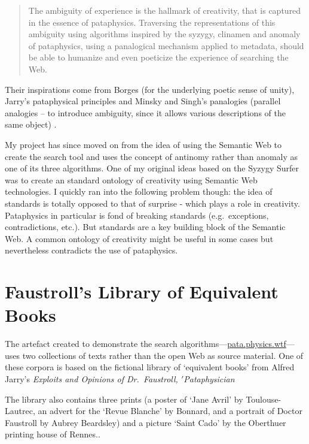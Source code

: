\begin{quotation}
  The ambiguity of experience is the hallmark of creativity, that is captured in the essence of pataphysics. Traversing the representations of this ambiguity using algorithms inspired by the syzygy, clinamen and anomaly of pataphysics, using a panalogical mechanism applied to metadata, should be able to humanize and even poeticize the experience of searching the Web. 
\end{quotation}

Their inspirations come from Borges \citeyear{Borges2000} (for the underlying poetic sense of unity), Jarry's pataphysical principles \citeyear{Jarry1996} and Minsky and Singh's panalogies (parallel analogies – to introduce ambiguity, since it allows various descriptions of the same object) \citeyear{Singh2005}.

My project has since moved on from the idea of using the Semantic Web to create the search tool and uses the concept of antinomy rather than anomaly as one of its three algorithms. One of my original ideas based on the Syzygy Surfer was to create an standard ontology of creativity using Semantic Web technologies. I quickly ran into the following problem though: the idea of standards is totally opposed to that of surprise - which plays a role in creativity. Pataphysics in particular is fond of breaking standards (e.g.\ exceptions, contradictions, etc.). But standards are a key building block of the Semantic Web. A common ontology of creativity might be useful in some cases but nevertheless contradicts the use of pataphysics.


\section{Faustroll's Library of Equivalent Books}
\label{s:faustlib}

The artefact created to demonstrate the search algorithms---\url{pata.physics.wtf}---uses two collections of texts rather than the open Web as source material. One of these corpora is based on the fictional library of `equivalent books' from Alfred Jarry's \textit{Exploits and Opinions of Dr.\ Faustroll, $'$Pataphysician} \citeyear[p.10-12]{Jarry1996}

The library also contains three prints (a poster of `Jane Avril' by Toulouse-Lautrec, an advert for the `Revue Blanche' by Bonnard, and a portrait of Doctor Faustroll by Aubrey Beardsley) and a picture `Saint Cado' by the Oberthuer printing house of Rennes.\autocite[p.12]{Jarry1996}.

